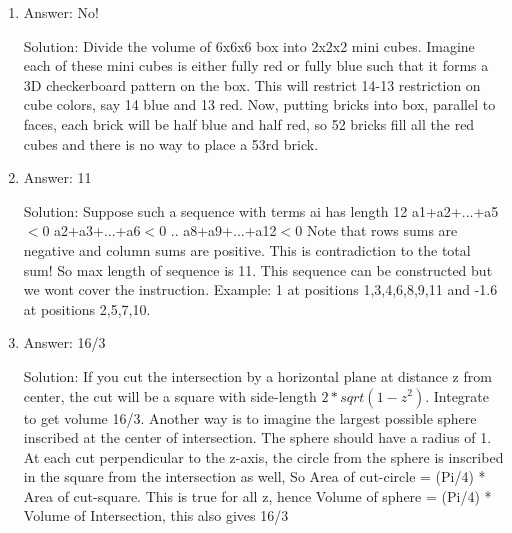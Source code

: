 \begin{enumerate}

\item
Answer: No!
 
Solution: Divide the volume of 6x6x6 box into 2x2x2 mini cubes. Imagine each of these mini cubes is either fully red or fully blue such that it forms a 3D checkerboard pattern on the box. This will restrict 14-13 restriction on cube colors, say 14 blue and 13 red. Now, putting bricks into box, parallel to faces, each brick will be half blue and half red, so 52 bricks fill all the red cubes and there is no way to place a 53rd brick.




\item
Answer: 11
 
Solution: Suppose such a sequence with terms {ai} has length 12
a1+a2+...+a5$<$0
a2+a3+...+a6$<$0
..
a8+a9+...+a12$<$0
Note that rows sums are negative and column sums are positive. This is contradiction to the total sum! So max length of sequence is 11. This sequence can be constructed but we wont cover the instruction. Example: 1 at positions 1,3,4,6,8,9,11 and -1.6 at positions 2,5,7,10.




\item
Answer: 16/3
 
Solution: If you cut the intersection by a horizontal plane at distance z from center, the cut will be a square with side-length $2 * sqrt( 1-z^2)$. Integrate to get volume 16/3.
Another way is to imagine the largest possible sphere inscribed at the center of intersection. The sphere should have a radius of 1. At each cut perpendicular to the z-axis, the circle from the sphere is inscribed in the square from the intersection as well, So Area of cut-circle = (Pi/4) * Area of cut-square. This is true for all z, hence Volume of sphere = (Pi/4) * Volume of Intersection, this also gives 16/3





\end{enumerate}
